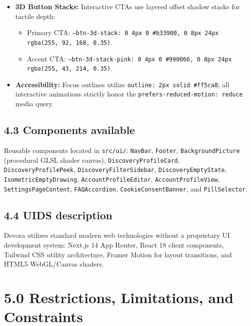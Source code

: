 \documentclass[11pt,letterpaper]{article}
\begin{document}
\begin{itemize}[leftmargin=*,itemsep=3pt]
\begin{itemize}[noitemsep]
  \item Pink gradient: \texttt{--grad-pink: linear-gradient(135deg, \#ff5ca8 0\%, \#ff2bd6 100\%)}.
  \end{itemize}
\item \textbf{3D Button Stacks:} Interactive CTAs use layered offset shadow stacks for tactile depth:
  \begin{itemize}[noitemsep]
  \item Primary CTA: \texttt{--btn-3d-stack: 0 4px 0 \#b33900, 0 8px 24px rgba(255, 92, 168, 0.35)}.
  \item Accent CTA: \texttt{--btn-3d-stack-pink: 0 4px 0 \#990066, 0 8px 24px rgba(255, 43, 214, 0.35)}.
  \end{itemize}
\item \textbf{Accessibility:} Focus outlines utilize \texttt{outline: 2px solid \#ff5ca8}; all interactive animations strictly honor the \texttt{prefers-reduced-motion: reduce} media query.
\end{itemize}

\subsection*{4.3 Components available}
Reusable components located in \texttt{src/ui/}: \texttt{NavBar}, \texttt{Footer}, \texttt{BackgroundPicture} (procedural GLSL shader canvas), \texttt{DiscoveryProfileCard}, \texttt{DiscoveryProfilePeek}, \texttt{DiscoveryFilterSidebar}, \texttt{DiscoveryEmptyState}, \texttt{IsometricEmptyDrawing}, \texttt{AccountProfileEditor}, \texttt{AccountProfileView}, \texttt{SettingsPageContent}, \texttt{FAQAccordion}, \texttt{CookieConsentBanner}, and \texttt{PillSelector}.

\subsection*{4.4 UIDS description}
Devora utilizes standard modern web technologies without a proprietary UI development system: Next.js 14 App Router, React 18 client components, Tailwind CSS utility architecture, Framer Motion for layout transitions, and HTML5 WebGL/Canvas shaders.

\newpage
\section*{5.0 Restrictions, Limitations, and Constraints}
\end{document}
